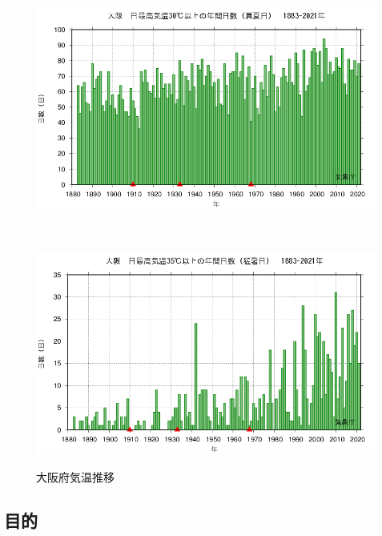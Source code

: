 \documentclass[a4j,fleqn,dvipdfmx,uplatex]{jsarticle}
\newcommand{\figref}[1]{Fig.\ \ref{#1}}
\newcommand{\subsecref}[1]{\ref{#1}\hspace{0.2zw} 節}
\begin{document}
\begin{figure}[tb]
    \centering
    \begin{minipage}[b]{\linewidth}
      \centering
      \includegraphics[width=\linewidth]{img/27_OSAKA_tmaxGE30_2021.png}
      \label{subfig1:temp_osaka}
    \end{minipage}\\
    \begin{minipage}[b]{\linewidth}
      \centering
      \includegraphics[width=\linewidth]{img/27_OSAKA_tmaxGE35_2021.png}
      \label{subfig1:temp_osaka2}
    \end{minipage}
    \caption{大阪府気温推移}
    \label{fig1:temp_osaka}
\end{figure}


\subsection{目的}\label{purpose}
\end{document}
